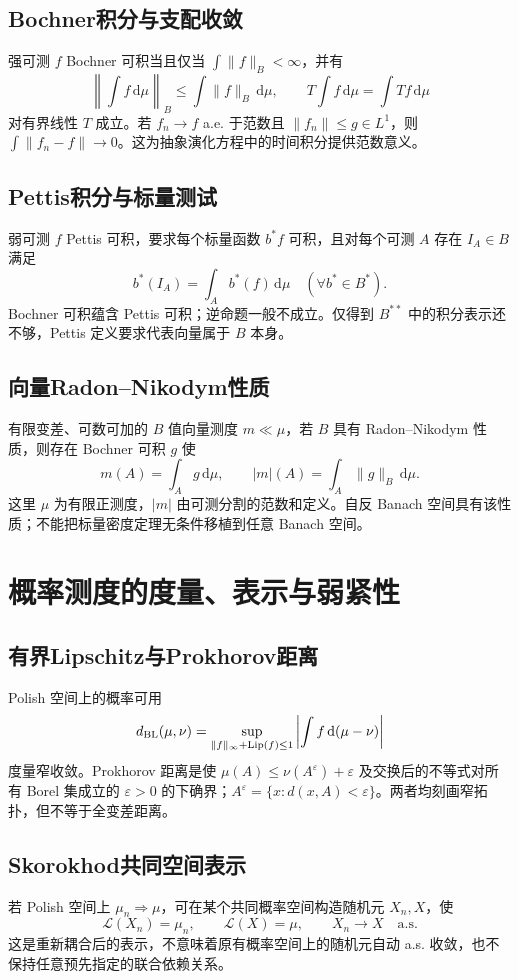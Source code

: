 \documentclass[../main.tex]{subfiles}
\begin{document}
\subsection{Bochner积分与支配收敛}
强可测 $f$ Bochner 可积当且仅当 $\int\|f\|_B<\infty$，并有
\[
\left\|\int f\,\mathrm d\mu\right\|_B\le\int\|f\|_B\,\mathrm d\mu,\qquad
T\int f\,\mathrm d\mu=\int Tf\,\mathrm d\mu
\]
对有界线性 $T$ 成立。若 $f_n\to f$ a.e. 于范数且 $\|f_n\|\le g\in L^1$，则 $\int\|f_n-f\|\to0$。这为抽象演化方程中的时间积分提供范数意义。
\subsection{Pettis积分与标量测试}
弱可测 $f$ Pettis 可积，要求每个标量函数 $b^*f$ 可积，且对每个可测 $A$ 存在 $I_A\in B$ 满足
\[
b^*(I_A)=\int_Ab^*(f)\,\mathrm d\mu\quad(\forall b^*\in B^*).
\]
Bochner 可积蕴含 Pettis 可积；逆命题一般不成立。仅得到 $B^{**}$ 中的积分表示还不够，Pettis 定义要求代表向量属于 $B$ 本身。
\subsection{向量Radon--Nikodym性质}
有限变差、可数可加的 $B$ 值向量测度 $m\ll\mu$，若 $B$ 具有 Radon--Nikodym 性质，则存在 Bochner 可积 $g$ 使
\[
m(A)=\int_Ag\,\mathrm d\mu,\qquad |m|(A)=\int_A\|g\|_B\,\mathrm d\mu.
\]
这里 $\mu$ 为有限正测度，$|m|$ 由可测分割的范数和定义。自反 Banach 空间具有该性质；不能把标量密度定理无条件移植到任意 Banach 空间。
\section{概率测度的度量、表示与弱紧性}
\subsection{有界Lipschitz与Prokhorov距离}
Polish 空间上的概率可用
\[
d_{\rm BL}(\mu,\nu)=\sup_{\|f\|_\infty+\operatorname{Lip}(f)\le1}
\left|\int f\,\mathrm d(\mu-\nu)\right|
\]
度量窄收敛。Prokhorov 距离是使 $\mu(A)\le\nu(A^\varepsilon)+\varepsilon$ 及交换后的不等式对所有 Borel 集成立的 $\varepsilon>0$ 的下确界；$A^\varepsilon=\{x:d(x,A)<\varepsilon\}$。两者均刻画窄拓扑，但不等于全变差距离。
\subsection{Skorokhod共同空间表示}
若 Polish 空间上 $\mu_n\Rightarrow\mu$，可在某个共同概率空间构造随机元 $X_n,X$，使
\[
\mathcal L(X_n)=\mu_n,\qquad\mathcal L(X)=\mu,\qquad X_n\to X\quad\text{a.s.}
\]
这是重新耦合后的表示，不意味着原有概率空间上的随机元自动 a.s. 收敛，也不保持任意预先指定的联合依赖关系。
\end{document}
